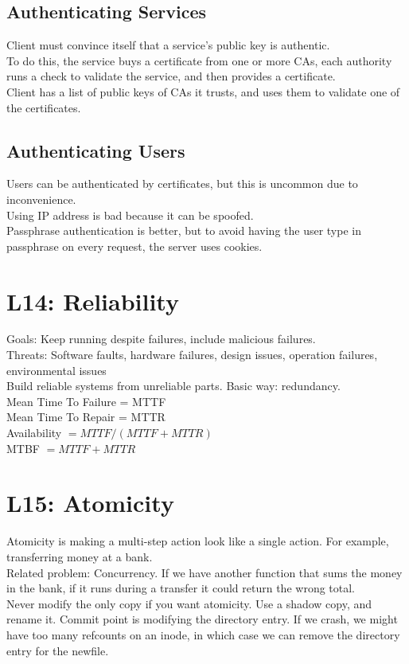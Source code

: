 \subsection{Authenticating Services}
Client must convince itself that a service's public key is authentic. \\
To do this, the service buys a certificate from one or more CAs, each authority runs a check to validate the service, and then provides a certificate. \\
Client has a list of public keys of CAs it trusts, and uses them to validate one of the certificates.
\subsection{Authenticating Users}
Users can be authenticated by certificates, but this is uncommon due to inconvenience.\\
Using IP address is bad because it can be spoofed.\\
Passphrase authentication is better, but to avoid having the user type in passphrase on every request, the server uses cookies.
\section{L14: Reliability}
Goals: Keep running despite failures, include malicious failures.\\
Threats: Software faults, hardware failures, design issues, operation failures, environmental issues\\
Build reliable systems from unreliable parts. Basic way: redundancy.\\
Mean Time To Failure = MTTF\\
Mean Time To Repair = MTTR\\
Availability $= MTTF/(MTTF+MTTR)$ \\
MTBF $= MTTF+MTTR$\\
\section{L15: Atomicity}
Atomicity is making a multi-step action look like a single action. For example, transferring money at a bank.\\
Related problem: Concurrency. If we have another function that sums the money in the bank, if it runs during a transfer it could return the wrong total.\\
Never modify the only copy if you want atomicity. Use a shadow copy, and rename it. Commit point is modifying the directory entry. If we crash, we might have too many refcounts on an inode, in which case we can remove the directory entry for the newfile.
